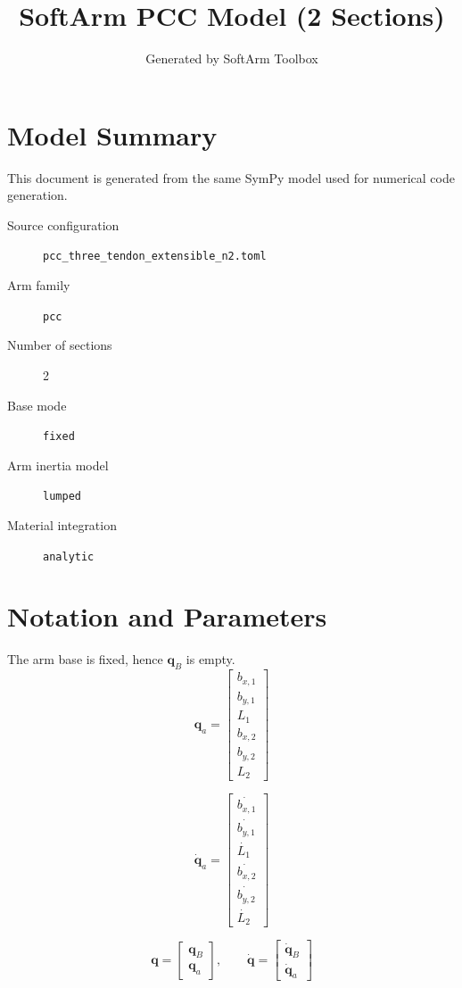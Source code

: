 \documentclass[11pt]{article}
\title{SoftArm PCC Model (2 Sections)}
\author{Generated by SoftArm Toolbox}
\date{}
\begin{document}
\maketitle

\section{Model Summary}
This document is generated from the same SymPy model used for numerical code generation.
\begin{description}
\item[Source configuration] \texttt{pcc\_three\_tendon\_extensible\_n2.toml}
\item[Arm family] \texttt{pcc}
\item[Number of sections] 2
\item[Base mode] \texttt{fixed}
\item[Arm inertia model] \texttt{lumped}
\item[Material integration] \texttt{analytic}
\end{description}

\section{Notation and Parameters}
The arm base is fixed, hence $\boldsymbol q_B$ is empty.
\begin{equation}
\boldsymbol q_a=\begin{bmatrix}b_{x,1}\\b_{y,1}\\L_{1}\\b_{x,2}\\b_{y,2}\\L_{2}\end{bmatrix}
\end{equation}

\begin{equation}
\dot{\boldsymbol q}_a=\begin{bmatrix}\dot{b_{x,1}}\\\dot{b_{y,1}}\\\dot{L_{1}}\\\dot{b_{x,2}}\\\dot{b_{y,2}}\\\dot{L_{2}}\end{bmatrix}
\end{equation}

\begin{equation}
\boldsymbol q=\begin{bmatrix}\boldsymbol q_B\\\boldsymbol q_a\end{bmatrix},\qquad \dot{\boldsymbol q}=\begin{bmatrix}\dot{\boldsymbol q}_B\\\dot{\boldsymbol q}_a\end{bmatrix}
\end{equation}
\end{document}
